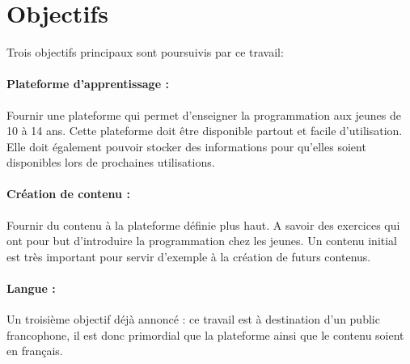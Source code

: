 \section{Objectifs}
\label{intro-objectifs}

Trois objectifs principaux sont poursuivis par ce travail:

\paragraph{Plateforme d'apprentissage :} Fournir une plateforme qui permet d'enseigner la programmation aux jeunes de 10 à 14 ans. Cette plateforme doit être disponible partout et facile d'utilisation. Elle doit également pouvoir stocker des informations pour qu'elles soient disponibles lors de prochaines utilisations.

\paragraph{Création de contenu :} Fournir du contenu à la plateforme définie plus haut. A savoir des exercices qui ont pour but d'introduire la programmation chez les jeunes. Un contenu initial est très important pour servir d'exemple à la création de futurs contenus.

\paragraph{Langue :} Un troisième objectif déjà annoncé : ce travail est à destination d'un public francophone, il est donc primordial que la plateforme ainsi que le contenu soient en français.
